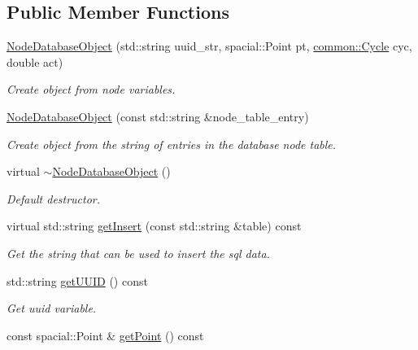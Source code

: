 \subsection*{\-Public \-Member \-Functions}
\begin{DoxyCompactItemize}
\item 
\hyperlink{classcryomesh_1_1manager_1_1NodeDatabaseObject_a69cbe2fb91ca27e0b167165c52d11231}{\-Node\-Database\-Object} (std\-::string uuid\-\_\-str, spacial\-::\-Point pt, \hyperlink{classcryomesh_1_1common_1_1Cycle}{common\-::\-Cycle} cyc, double act)
\begin{DoxyCompactList}\small\item\em \-Create object from node variables. \end{DoxyCompactList}\item 
\hyperlink{classcryomesh_1_1manager_1_1NodeDatabaseObject_a96ec12a3290ce621734fb5695a4ca5c1}{\-Node\-Database\-Object} (const std\-::string \&node\-\_\-table\-\_\-entry)
\begin{DoxyCompactList}\small\item\em \-Create object from the string of entries in the database node table. \end{DoxyCompactList}\item 
virtual \hyperlink{classcryomesh_1_1manager_1_1NodeDatabaseObject_a1a9157f719dfef63441e0bc1d3c9a86e}{$\sim$\-Node\-Database\-Object} ()
\begin{DoxyCompactList}\small\item\em \-Default destructor. \end{DoxyCompactList}\item 
virtual std\-::string \hyperlink{classcryomesh_1_1manager_1_1NodeDatabaseObject_ac5512082d08fa59cbaa496b711f4c8c2}{get\-Insert} (const std\-::string \&table) const 
\begin{DoxyCompactList}\small\item\em \-Get the string that can be used to insert the sql data. \end{DoxyCompactList}\item 
std\-::string \hyperlink{classcryomesh_1_1manager_1_1NodeDatabaseObject_a57b4da149aa2ac3ea49b6cb10b06afda}{get\-U\-U\-I\-D} () const 
\begin{DoxyCompactList}\small\item\em \-Get uuid variable. \end{DoxyCompactList}\item 
const spacial\-::\-Point \& \hyperlink{classcryomesh_1_1manager_1_1NodeDatabaseObject_a8271688dc70be0b476f4890633d99fb0}{get\-Point} () const 

\end{DoxyCompactItemize}
